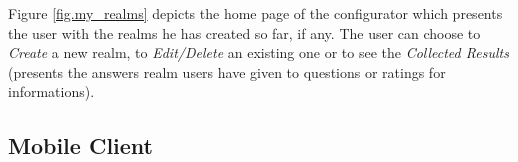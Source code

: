 Figure \ref{fig.my_realms} depicts the home page of the configurator which presents the user with the realms he has created so far, if any. The user can choose to \emph{Create} a new realm, to \emph{Edit/Delete} an existing one or to see the \emph{Collected Results} (presents the answers realm users have given to questions or ratings for informations).



\subsection{Mobile Client}
